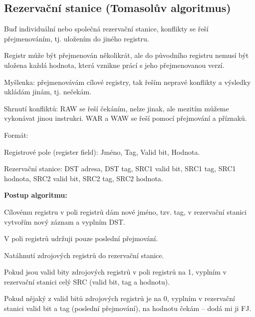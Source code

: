 \subsection{Rezervační stanice (Tomasolův algoritmus)}

\begin{compactitem}
    \item Buď individuální nebo společná rezervační stanice, konflikty se řeší přejmenováním, tj. uložením do jiného registru.

    \item Registr může být přejmenován několikrát, ale do původního registru nemusí být uložena každá hodnota, která vznikne prácí s jeho přejmenovanou verzí.

    \item Myšlenka: přejmenovávám cílové registry, tak řeším nepravé konflikty a výsledky ukládám jinám, tj. nečekám.

    \item Shrnutí konfliktů: RAW se řeší čekáním, nelze jinak, ale mezitím můžeme vykonávat jinou instrukci. WAR a WAW se řeší pomocí přejmování a příznaků.

    \item Formát: \begin{compactitem}
        \item Registrové pole (register field): Jméno, Tag, Valid bit, Hodnota.
        \item Rezervační stanice: DST adresa, DST tag, SRC1 valid bit, SRC1 tag, SRC1 hodnota, SRC2 valid bit, SRC2 tag, SRC2 hodnota.
    \end{compactitem}

    \item \textbf{Postup algoritmu:} \begin{compactenum}
        \item Cílovému registru v poli registrů dám nové jméno, tzv. tag, v rezervační stanici vytvořím nový záznam a vyplním DST. \begin{compactenum}
            \item V poli registrů udržuji pouze poslední přejmování.
        \end{compactenum}

        \item Natáhnutí zdrojových registrů do rezervační stanice. \begin{compactenum}
            \item Pokud jsou valid bity zdrojových registrů v poli registrů na 1, vyplním v rezervační stanici celý SRC (valid bit, tag a hodnotu).
            \item Pokud nějaký z valid bitů zdrojových registrů je na 0, vyplním v rezervační stanici valid bit a tag (poslední přejmování), na hodnotu čekám -- dodá mi ji FJ.
        \end{compactenum}


\end{compactenum}
\end{compactitem}
